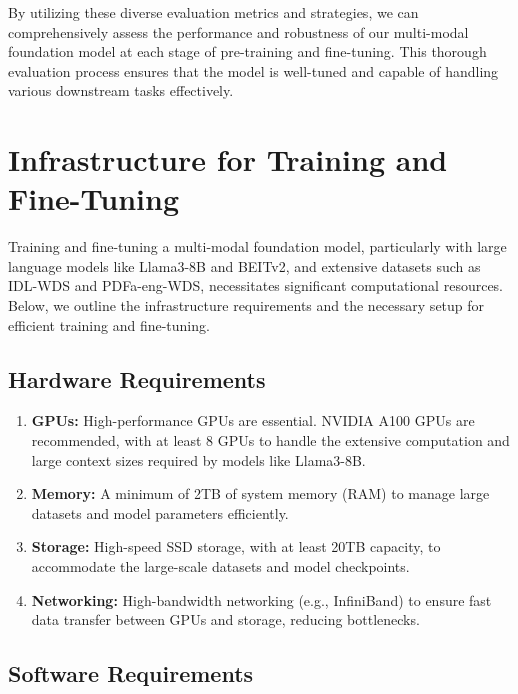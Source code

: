 \documentclass{article}
\begin{document}
By utilizing these diverse evaluation metrics and strategies, we can comprehensively assess the performance and robustness of our multi-modal foundation model at each stage of pre-training and fine-tuning. This thorough evaluation process ensures that the model is well-tuned and capable of handling various downstream tasks effectively.

\section{Infrastructure for Training and Fine-Tuning}

Training and fine-tuning a multi-modal foundation model, particularly with large language models like Llama3-8B and BEITv2, and extensive datasets such as IDL-WDS and PDFa-eng-WDS, necessitates significant computational resources. Below, we outline the infrastructure requirements and the necessary setup for efficient training and fine-tuning.

\subsection{Hardware Requirements}

\begin{enumerate}
    \item \textbf{GPUs:} High-performance GPUs are essential. NVIDIA A100 GPUs are recommended, with at least 8 GPUs to handle the extensive computation and large context sizes required by models like Llama3-8B.
    \item \textbf{Memory:} A minimum of 2TB of system memory (RAM) to manage large datasets and model parameters efficiently.
    \item \textbf{Storage:} High-speed SSD storage, with at least 20TB capacity, to accommodate the large-scale datasets and model checkpoints.
    \item \textbf{Networking:} High-bandwidth networking (e.g., InfiniBand) to ensure fast data transfer between GPUs and storage, reducing bottlenecks.
\end{enumerate}

\subsection{Software Requirements}
\end{document}
